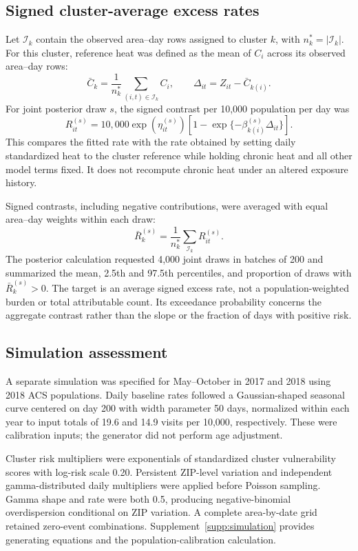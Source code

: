 \documentclass[11pt,letterpaper]{article}
\begin{document}
\subsection{Signed cluster-average excess rates}
Let \(\mathcal I_k\) contain the observed area--day rows assigned to cluster \(k\), with \(n_k^*=|\mathcal I_k|\). For this cluster, reference heat was defined as the mean of \(C_i\) across its observed area--day rows:
\begin{equation}
\bar C_k=\frac{1}{n_k^*}\sum_{(i,t)\in\mathcal I_k}C_i,
\qquad \Delta_{it}=Z_{it}-\bar C_{k(i)}.
\end{equation}
For joint posterior draw \(s\), the signed contrast per 10,000 population per day was
\begin{equation}
R_{it}^{(s)}=10{,}000\exp(\eta_{it}^{(s)})
\left[1-\exp\{-\beta_{k(i)}^{(s)}\Delta_{it}\}\right].
\label{eq:methods-ar}
\end{equation}
This compares the fitted rate with the rate obtained by setting daily standardized heat to the cluster reference while holding chronic heat and all other model terms fixed. It does not recompute chronic heat under an altered exposure history.

Signed contrasts, including negative contributions, were averaged with equal area--day weights within each draw:
\begin{equation}
\bar R_k^{(s)}=\frac{1}{n_k^*}\sum_{\mathcal I_k}R_{it}^{(s)}.
\end{equation}
The posterior calculation requested 4,000 joint draws in batches of 200 and summarized the mean, 2.5th and 97.5th percentiles, and proportion of draws with \(\bar R_k^{(s)}>0\). The target is an average signed excess rate, not a population-weighted burden or total attributable count. Its exceedance probability concerns the aggregate contrast rather than the slope or the fraction of days with positive risk.

\subsection{Simulation assessment}
A separate simulation was specified for May--October in 2017 and 2018 using 2018 ACS populations. Daily baseline rates followed a Gaussian-shaped seasonal curve centered on day 200 with width parameter 50 days, normalized within each year to input totals of 19.6 and 14.9 visits per 10,000, respectively. These were calibration inputs; the generator did not perform age adjustment.

Cluster risk multipliers were exponentials of standardized cluster vulnerability scores with log-risk scale 0.20. Persistent ZIP-level variation and independent gamma-distributed daily multipliers were applied before Poisson sampling. Gamma shape and rate were both 0.5, producing negative-binomial overdispersion conditional on ZIP variation. A complete area-by-date grid retained zero-event combinations. Supplement~\ref{supp:simulation} provides generating equations and the population-calibration calculation.
\end{document}
